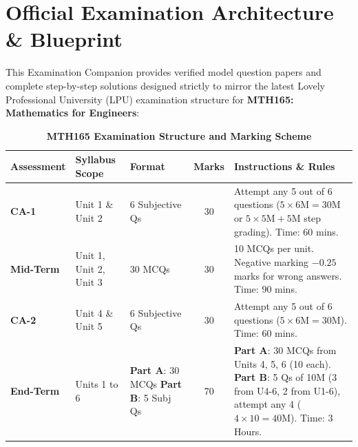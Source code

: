 \chapter*{Official Examination Architecture \& Blueprint}

This Examination Companion provides verified model question papers and complete step-by-step solutions designed strictly to mirror the latest Lovely Professional University (LPU) examination structure for \textbf{MTH165: Mathematics for Engineers}:

\begin{table}[htbp]
\centering
\caption{\textbf{MTH165 Examination Structure and Marking Scheme}}
\vspace{2mm}
\begin{tabularx}{\textwidth}{l p{3.2cm} p{2.8cm} c X}
\toprule
\textbf{Assessment} & \textbf{Syllabus Scope} & \textbf{Format} & \textbf{Marks} & \textbf{Instructions \& Rules} \\
\midrule
\textbf{CA-1} & Unit 1 \& Unit 2 & 6 Subjective Qs & 30 & Attempt any 5 out of 6 questions ($5 \times 6\text{M} = 30\text{M}$ or $5 \times 5\text{M} + 5\text{M}$ step grading). Time: 60 mins. \\
\addlinespace
\textbf{Mid-Term} & Unit 1, Unit 2, Unit 3 & 30 MCQs & 30 & 10 MCQs per unit. Negative marking $-0.25$ marks for wrong answers. Time: 90 mins. \\
\addlinespace
\textbf{CA-2} & Unit 4 \& Unit 5 & 6 Subjective Qs & 30 & Attempt any 5 out of 6 questions ($5 \times 6\text{M} = 30\text{M}$). Time: 60 mins. \\
\addlinespace
\textbf{End-Term} & Units 1 to 6 & \textbf{Part A}: 30 MCQs \newline \textbf{Part B}: 5 Subj Qs & 70 & \textbf{Part A}: 30 MCQs from Units 4, 5, 6 (10 each). \newline \textbf{Part B}: 5 Qs of 10M (3 from U4-6, 2 from U1-6), attempt any 4 ($4 \times 10 = 40\text{M}$). Time: 3 Hours. \\
\bottomrule
\end{tabularx}
\end{table}

\newpage
